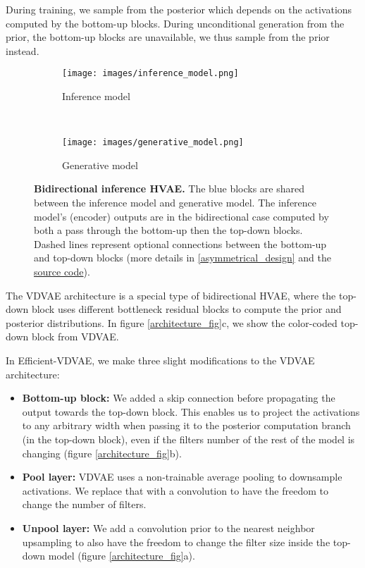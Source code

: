 \documentclass{article}
\begin{document}
During training, we sample  from the posterior  which depends on the activations  computed by the bottom-up blocks. During unconditional generation from the prior, the bottom-up blocks are unavailable, we thus sample  from the prior  instead.

\begin{figure*}[t!]
    \centering
    \begin{subfigure}[t]{0.5\textwidth}
        \centering
        \texttt{[image: images/inference\_model.png]}
        \caption{Inference model }
    \end{subfigure}~ 
    \begin{subfigure}[t]{0.5\textwidth}
        \centering
        \texttt{[image: images/generative\_model.png]}
        \caption{Generative model }
    \end{subfigure}
    \caption{\textbf{Bidirectional inference HVAE.} The blue blocks are shared between the inference model and generative model. The inference model's (encoder) outputs are in the bidirectional case computed by both a pass through the bottom-up then the top-down blocks. Dashed lines represent optional connections between the bottom-up and top-down blocks (more details in \ref{asymmetrical_design} and the \href{https://github.com/Rayhane-mamah/Efficient-VDVAE}{source code}).}
\label{bidirectional_hvae_fig}
\end{figure*}

The VDVAE architecture is a special type of bidirectional HVAE, where the top-down block uses different bottleneck residual blocks\cite{bottleneck_residual} to compute the prior and posterior distributions. In figure \ref{architecture_fig}c, we show the color-coded top-down block from VDVAE.

In Efficient-VDVAE, we make three slight modifications to the VDVAE architecture:
\begin{itemize}
    \item \textbf{Bottom-up block:} We added a skip connection before propagating the output towards the top-down block. This enables us to project the activations  to any arbitrary width when passing it to the posterior computation branch (in the top-down block), even if the filters number of the rest of the model is changing (figure \ref{architecture_fig}b).
    \item \textbf{Pool layer:} VDVAE uses a non-trainable average pooling to downsample activations. We replace that with a  convolution to have the freedom to change the number of filters.
    \item \textbf{Unpool layer:} We add a  convolution prior to the nearest neighbor upsampling to also have the freedom to change the filter size inside the top-down model (figure \ref{architecture_fig}a).
\end{itemize}
\end{document}

